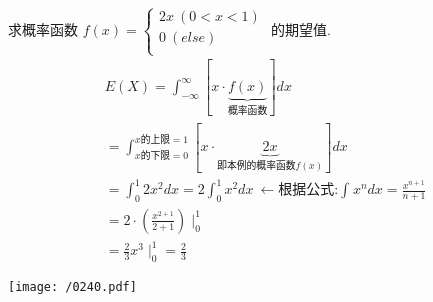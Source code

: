 \documentclass[UTF8]{ctexart}
\begin{document}
\begin{myEnvSample}
	求概率函数 $
	f(x)=\left\{ \begin{array}{l}
		2x\ (0<x<1)\\
		0\ (else)\\
	\end{array} \right. 
	$ 的期望值. \\
	
	\begin{align*}  %
	& E(X)=\int_{-\infty}^{\infty}{\left[ x\cdot \underset{\text{概率函数}}{\underbrace{f\left( x \right) }} \right] dx}\\
& =\int_{x\text{的下限}=0}^{x\text{的上限}=1}{\left[ x\cdot \underset{\text{即本例的概率函数}f(x)}{\underbrace{2x}} \right]}dx\\
& =\int_0^1{2x^2}dx=2\int_0^1{x^2}dx\ \gets \text{根据公式:}\int_{}^{}{x^n}dx=\frac{x^{n+1}}{n+1}\\
& =2\cdot \left( \frac{x^{2+1}}{2+1} \right) \mid_{0}^{1} \\
& =\frac{2}{3}x^3\mid_{0}^{1}=\frac{2}{3}
	\end{align*}

\texttt{[image: /0240.pdf]} 
\end{myEnvSample}
\vspace{1em} 
\end{document}

